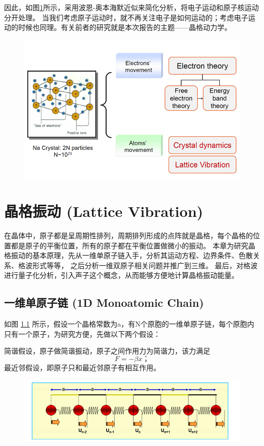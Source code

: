 \documentclass[declarePage]{ecnuthesis}
\begin{document}
因此，如图\ref{BOA}所示，采用波恩-奥本海默近似来简化分析，将电子运动和原子核运动分开处理。%
当我们考虑原子运动时，就不再关注电子是如何运动的；考虑电子运动的时候也同理。有关前者的研究就是本次报告的主题——晶格动力学。
\begin{figure}[htb]
    \centering
    \includegraphics[width=.7\textwidth]{BOA.png}
    \label{BOA}
\end{figure}

\chapter{晶格振动 (Lattice Vibration)}

在晶体中，原子都是呈周期性排列，周期排列形成的点阵就是晶格，每个晶格的位置都是原子的平衡位置，所有的原子都在平衡位置做微小的振动。%
本章为研究晶格振动的基本原理，先从一维单原子链入手，分析其运动方程、边界条件、色散关系、格波形式等等，%
之后分析一维双原子相关问题并推广到三维。%
最后，对格波进行量子化分析，引入声子这个概念，从而能够方便地计算晶格振动能量。

\section{一维单原子链 (1D Monoatomic Chain)}

如图 \ref{1DMC} 所示，假设一个晶格常数为a，有N个原胞的一维单原子链，每个原胞内只有一个原子，为研究方便，先做以下两个假设：

简谐假设，原子做简谐振动，原子之间作用力为简谐力，该力满足
\begin{equation}
    F = - \beta x \text{；}
\end{equation}
最近邻假设，即原子只和最近邻原子有相互作用。
\begin{figure}[htb]
    \centering
    \includegraphics[width=.7\textwidth]{1DMC.png}
    \label{1DMC}
\end{figure}
\end{document}
